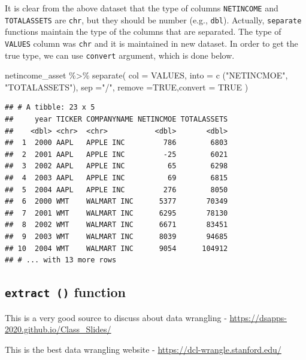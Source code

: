 \documentclass[
]{book}
\newenvironment{Shaded}{\begin{snugshade}}{\end{snugshade}}
\newcommand{\AttributeTok}[1]{\textcolor[rgb]{0.77,0.63,0.00}{#1}}
\newcommand{\ConstantTok}[1]{\textcolor[rgb]{0.00,0.00,0.00}{#1}}
\newcommand{\FunctionTok}[1]{\textcolor[rgb]{0.00,0.00,0.00}{#1}}
\newcommand{\NormalTok}[1]{#1}
\newcommand{\SpecialCharTok}[1]{\textcolor[rgb]{0.00,0.00,0.00}{#1}}
\newcommand{\StringTok}[1]{\textcolor[rgb]{0.31,0.60,0.02}{#1}}
\begin{document}
It is clear from the above dataset that the type of columns \texttt{NETINCOME} and \texttt{TOTALASSETS} are \texttt{chr}, but they should be number (e.g., \texttt{dbl}). Actually, \texttt{separate} functions maintain the type of the columns that are separated. The type of \texttt{VALUES} column was \texttt{chr} and it is maintained in new dataset. In order to get the true type, we can use \texttt{convert} argument, which is done below.

\begin{Shaded}
\begin{Highlighting}[]
\NormalTok{netincome\_asset  }\SpecialCharTok{\%\textgreater{}\%} 
  \FunctionTok{separate}\NormalTok{(}
    \AttributeTok{col =}\NormalTok{ VALUES, }\AttributeTok{into =} \FunctionTok{c}\NormalTok{ (}\StringTok{"NETINCMOE"}\NormalTok{, }\StringTok{"TOTALASSETS"}\NormalTok{), }\AttributeTok{sep =}\StringTok{"/"}\NormalTok{,}
    \AttributeTok{remove =}\ConstantTok{TRUE}\NormalTok{,}\AttributeTok{convert =} \ConstantTok{TRUE}
\NormalTok{  )}
\end{Highlighting}
\end{Shaded}

\begin{verbatim}
## # A tibble: 23 x 5
##     year TICKER COMPANYNAME NETINCMOE TOTALASSETS
##    <dbl> <chr>  <chr>           <dbl>       <dbl>
##  1  2000 AAPL   APPLE INC         786        6803
##  2  2001 AAPL   APPLE INC         -25        6021
##  3  2002 AAPL   APPLE INC          65        6298
##  4  2003 AAPL   APPLE INC          69        6815
##  5  2004 AAPL   APPLE INC         276        8050
##  6  2000 WMT    WALMART INC      5377       70349
##  7  2001 WMT    WALMART INC      6295       78130
##  8  2002 WMT    WALMART INC      6671       83451
##  9  2003 WMT    WALMART INC      8039       94685
## 10  2004 WMT    WALMART INC      9054      104912
## # ... with 13 more rows
\end{verbatim}

\hypertarget{extract-function}{%
\subsection{\texorpdfstring{\texttt{extract\ ()} function}{extract () function}}\label{extract-function}}

This is a very good source to discuss about data wrangling - \url{https://dsapps-2020.github.io/Class_Slides/}

This is the best data wrangling website -
\url{https://dcl-wrangle.stanford.edu/}
\end{document}
